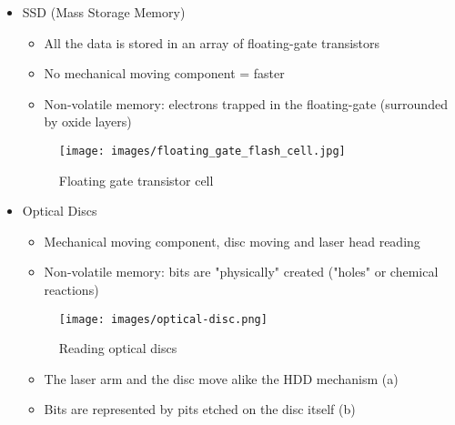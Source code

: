 \documentclass[handout]{beamer}[10pt, usepdftitle=false]
\begin{document}
	\begin{frame}
	
	\begin{itemize}
		\item {SSD (Mass Storage Memory)
			\begin{itemize}
				\item{All the data is stored in an array of floating-gate transistors}
				\item{No mechanical moving component = faster}
				\item{Non-volatile memory: electrons trapped in the floating-gate (surrounded by oxide layers)}
						
			
			\end{itemize} 
			
			\begin{figure}
				\texttt{[image: images/floating\_gate\_flash\_cell.jpg]} 
     			\vspace*{-0.5em}
				\caption{Floating gate transistor cell}
			\end{figure}			
			
			
			}
	
	\end{itemize}
	
	
	\end{frame}  
	
	\begin{frame}
	
	\begin{itemize}
		\item {Optical Discs
			\begin{itemize}
				\item{Mechanical moving component, disc moving and laser head reading}
				\item{Non-volatile memory: bits are "physically" created ("holes" or chemical reactions)}			
			\end{itemize} 
			
		\begin{figure}
			\texttt{[image: images/optical-disc.png]} 
    	 	\vspace*{-0.5em}
			\caption{Reading optical discs}
		\end{figure}			
		
	
		\begin{itemize}
			\item{The laser arm and the disc move alike the HDD mechanism (a)}	
			\item{Bits are represented by pits etched on the disc itself (b)}
		\end{itemize}		
	}
	
	\end{itemize}
	
	\end{frame}	
	
\end{document}
